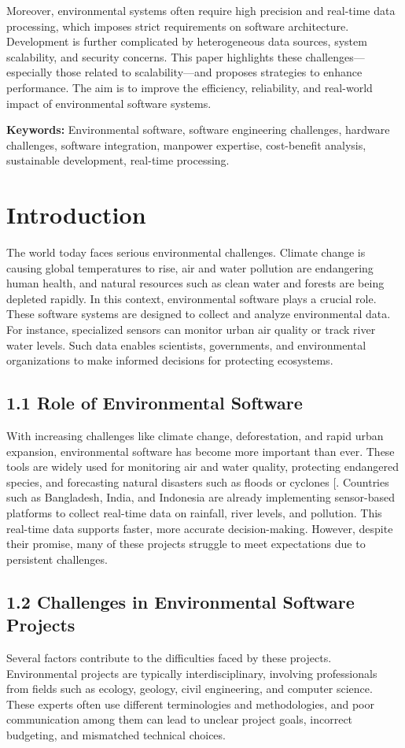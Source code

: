 \documentclass[12pt, a4paper]{article} %
\begin{document}
Moreover, environmental systems often require high precision and real-time data processing, which imposes strict requirements on software architecture. Development is further complicated by heterogeneous data sources, system scalability, and security concerns. This paper highlights these challenges—especially those related to scalability—and proposes strategies to enhance performance. The aim is to improve the efficiency, reliability, and real-world impact of environmental software systems.

\textbf{Keywords:} Environmental software, software engineering challenges, hardware challenges, software integration, manpower expertise, cost-benefit analysis, sustainable development, real-time processing.

\section{Introduction}
The world today faces serious environmental challenges. Climate change is causing global temperatures to rise, air and water pollution are endangering human health, and natural resources such as clean water and forests are being depleted rapidly. In this context, environmental software plays a crucial role. These software systems are designed to collect and analyze environmental data. For instance, specialized sensors can monitor urban air quality or track river water levels. Such data enables scientists, governments, and environmental organizations to make informed decisions for protecting ecosystems.

\subsection*{1.1 Role of Environmental Software}
With increasing challenges like climate change, deforestation, and rapid urban expansion, environmental software has become more important than ever. These tools are widely used for monitoring air and water quality, protecting endangered species, and forecasting natural disasters such as floods or cyclones [\cite{ref1}. Countries such as Bangladesh, India, and Indonesia are already implementing sensor-based platforms to collect real-time data on rainfall, river levels, and pollution. This real-time data supports faster, more accurate decision-making. However, despite their promise, many of these projects struggle to meet expectations due to persistent challenges.

\subsection*{1.2 Challenges in Environmental Software Projects}
Several factors contribute to the difficulties faced by these projects. Environmental projects are typically interdisciplinary, involving professionals from fields such as ecology, geology, civil engineering, and computer science. These experts often use different terminologies and methodologies, and poor communication among them can lead to unclear project goals, incorrect budgeting, and mismatched technical choices.
\end{document}
